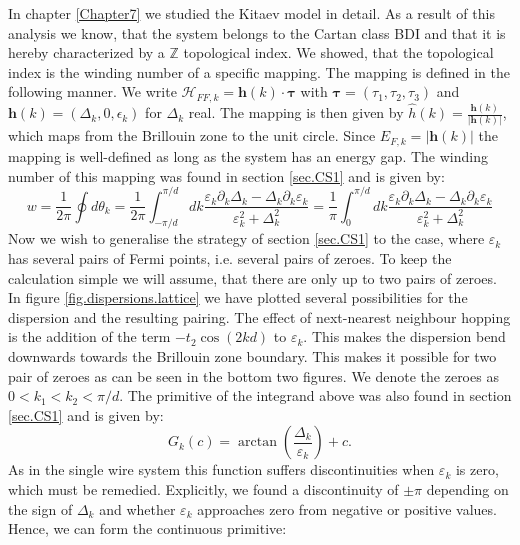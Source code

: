 In chapter \ref{Chapter7} we studied the Kitaev model in detail. As a result of this analysis we know, that the system belongs to the Cartan class BDI and that it is hereby characterized by a $\mathbb{Z}$ topological index. We showed, that the topological index is the winding number of a specific mapping. The mapping is defined in the following manner. We write $\mathcal{H}_{FF,k} = \mathbf{h}(k)\cdot \boldsymbol\tau$ with $\boldsymbol\tau = (\tau_1, \tau_2, \tau_3)$ and $\mathbf{h}(k) = (\Delta_k, 0, \epsilon_k)$ for $\Delta_k$ real. The mapping is then given by $\hat{h}(k) = \frac{\mathbf{h}(k)}{|\mathbf{h}(k)|}$, which maps from the Brillouin zone to the unit circle. Since $E_{F,k} = |\mathbf{h}(k)|$ the mapping is well-defined as long as the system has an energy gap. The winding number of this mapping was found in section \ref{sec.CS1} and is given by:
\begin{equation}
w = \frac{1}{2\pi}\oint d\theta_k = \frac{1}{2\pi}\int_{-\pi/d}^{\pi/d} dk \frac{\varepsilon_k\partial_k\Delta_k - \Delta_k\partial_k\varepsilon_k}{\varepsilon^2_k + \Delta^2_k} = \frac{1}{\pi}\int_{0}^{\pi/d} dk \frac{\varepsilon_k\partial_k\Delta_k - \Delta_k\partial_k\varepsilon_k}{\varepsilon^2_k + \Delta^2_k}
\label{eq.windingnumber.kitaevmodel}
\end{equation} 
Now we wish to generalise the strategy of section \ref{sec.CS1} to the case, where $\varepsilon_k$ has several pairs of Fermi points, i.e. several pairs of zeroes. To keep the calculation simple we will assume, that there are only up to two pairs of zeroes. In figure \ref{fig.dispersions.lattice} we have plotted several possibilities for the dispersion and the resulting pairing. The effect of next-nearest neighbour hopping is the addition of the term $-t_2\cos(2kd)$ to $\varepsilon_k$. This makes the dispersion bend downwards towards the Brillouin zone boundary. This makes it possible for two pair of zeroes as can be seen in the bottom two figures. We denote the zeroes as $0 < k_1 < k_2 < \pi / d$. The primitive of the integrand above was also found in section \ref{sec.CS1} and is given by:
\begin{equation}
G_k(c) = \arctan\left(\frac{\Delta_k}{\varepsilon_k}\right) + c. \nonumber
\end{equation}
As in the single wire system this function suffers discontinuities when $\varepsilon_k$ is zero, which must be remedied. Explicitly, we found a discontinuity of $\pm \pi$ depending on the sign of $\Delta_k$ and whether $\varepsilon_k$ approaches zero from negative or positive values. Hence, we can form the continuous primitive:

